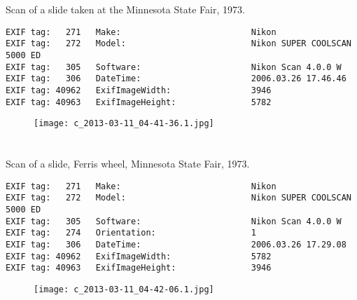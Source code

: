 \section{\protect{}}
\noindent Scan of a slide taken at the Minnesota State Fair, 1973.
\noindent
\begin{lstlisting}
EXIF tag:   271   Make:                          Nikon
EXIF tag:   272   Model:                         Nikon SUPER COOLSCAN 5000 ED
EXIF tag:   305   Software:                      Nikon Scan 4.0.0 W
EXIF tag:   306   DateTime:                      2006.03.26 17.46.46
EXIF tag: 40962   ExifImageWidth:                3946
EXIF tag: 40963   ExifImageHeight:               5782

\end{lstlisting}
\clearpage
\begin{figure}
\raggedleft
\texttt{[image: c\_2013-03-11\_04-41-36.1.jpg]}
\end{figure}


\clearpage
\section{\protect{}}
\noindent Scan of a slide, Ferris wheel, Minnesota State Fair, 1973.
\noindent
\begin{lstlisting}
EXIF tag:   271   Make:                          Nikon
EXIF tag:   272   Model:                         Nikon SUPER COOLSCAN 5000 ED
EXIF tag:   305   Software:                      Nikon Scan 4.0.0 W
EXIF tag:   274   Orientation:                   1
EXIF tag:   306   DateTime:                      2006.03.26 17.29.08
EXIF tag: 40962   ExifImageWidth:                5782
EXIF tag: 40963   ExifImageHeight:               3946

\end{lstlisting}
\clearpage
\begin{figure}
\raggedleft
\texttt{[image: c\_2013-03-11\_04-42-06.1.jpg]}
\end{figure}


\clearpage
